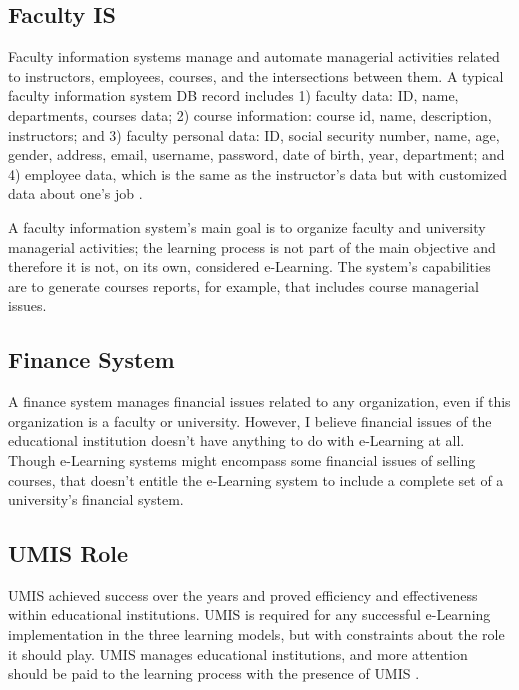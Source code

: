 \documentclass[12pt,a4paper,final,twoside,onecolumn,titlepage]{book}
\begin{document}
\subsection{Faculty IS}
Faculty information systems manage and automate managerial activities related to instructors, employees, courses, and the intersections between them. A typical faculty information system \gls{DB} record includes 1) faculty data: ID, name, departments, courses data; 2) course information: course id, name, description, instructors; and 3) faculty personal data: ID, social security number, name, age, gender, address, email, username, password, date of birth, year, department; and 4) employee data, which is the same as the instructor's data but with customized data about one's job \cite{UMIS47}.

A faculty information system's main goal is to organize faculty and university managerial activities; the learning process is not part of the main objective and therefore it is not, on its own, considered e-Learning. The system's capabilities are to generate courses reports, for example, that includes course managerial issues.

\subsection{Finance System}
A finance system manages financial issues related to any organization, even if this organization is a faculty or university. However, I believe financial issues of the educational institution doesn't have anything to do with e-Learning at all. Though e-Learning systems might encompass some financial issues of selling courses, that doesn't entitle the e-Learning system to include a complete set of a university's financial system.

\subsection{UMIS Role}
\gls{UMIS} achieved success over the years and proved efficiency and effectiveness within educational institutions. \gls{UMIS} is required for any successful e-Learning implementation in the three learning models, but with constraints about the role it should play. \gls{UMIS} manages educational institutions, and more attention should be paid to the learning process with the presence of \gls{UMIS} \cite{UMIS31}.
\end{document}

